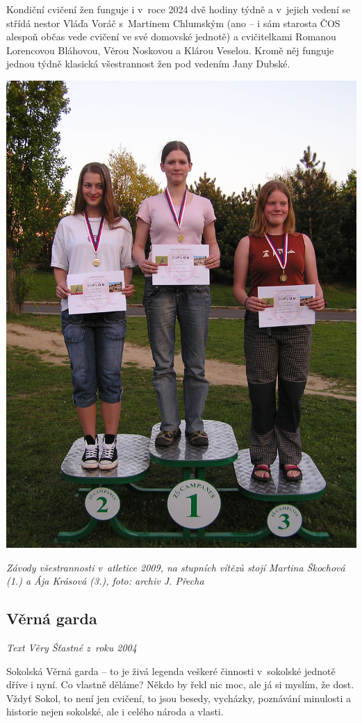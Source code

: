 \documentclass[a5paper, 11pt, twoside]{article}
\begin{document}
Kondiční cvičení žen funguje i v~roce 2024 dvě hodiny týdně a v~jejich
vedení se střídá nestor Vláďa Voráč s~Martinem Chlumským (ano -- i sám
starosta ČOS alespoň občas vede cvičení ve své domovské jednotě) a
cvičitelkami Romanou Lorencovou Bláhovou, Věrou Noskovou a Klárou
Veselou. Kromě něj funguje jednou týdně klasická všestrannost žen pod
vedením Jany Dubské.

 \includegraphics[width=\textwidth]{img/74_zavody_atletika.JPG}

\textit{Závody všestrannosti v~atletice 2009, na stupních vítězů stojí
Martina Škochová (1.) a Ája Krásová (3.), foto: archiv J. Přecha}

\subsection{Věrná garda}

\textit{Text Věry Šťastné z~roku 2004}

Sokolská Věrná garda -- to je živá legenda veškeré činnosti v~sokolské
jednotě dříve i nyní. Co vlastně děláme? Někdo by řekl nic moc, ale já
si myslím, že dost. Vždyť Sokol, to není jen cvičení, to jsou besedy,
vycházky, poznávání minulosti a historie nejen sokolské, ale i celého
národa a vlasti.
\end{document}
